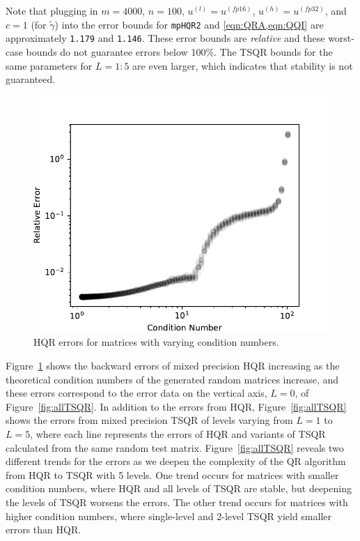 Note that plugging in $m=4000$, $n=100$, $u^{(l)}=u^{(fp16)}$, $u^{(h)}=u^{(fp32)}$, and $c=1$ (for $\tilde{\gamma}$) into the error bounds for {\tt mpHQR2} and \cref{eqn:QRA,eqn:QQI} are approximately {\tt 1.179} and {\tt 1.146}.
These error bounds are \emph{relative} and these worst-case bounds do not guarantee errors below 100\%.
The TSQR bounds for the same parameters for $L=1:5$ are even larger, which indicates that stability is not guaranteed. 
\begin{figure}
	\centering
	\vspace{-10pt}
	\includegraphics[width=.4\textwidth]{./figures/unblocked.pdf}
	\caption{\label{fig:unblocked} HQR errors for matrices with varying condition numbers.}
\end{figure}
Figure~\ref{fig:unblocked} shows the backward errors of mixed precision HQR increasing as the theoretical condition numbers of the generated random matrices increase, and these errors correspond to the error data on the vertical axis, $L=0$, of Figure~\ref{fig:allTSQR}.
In addition to the errors from HQR, Figure~\ref{fig:allTSQR} shows the errors from mixed precision TSQR of levels varying from $L=1$ to $L=5$, where each line represents the errors of HQR and variants of TSQR calculated from the same random test matrix.
Figure~\ref{fig:allTSQR} reveals two different trends for the errors as we deepen the complexity of the QR algorithm from HQR to TSQR with 5 levels. 
One trend occurs for matrices with smaller condition numbers, where HQR and all levels of TSQR are stable, but deepening the levels of TSQR worsens the errors. 
The other trend occurs for matrices with higher condition numbers, where single-level and 2-level TSQR yield smaller errors than HQR. 
